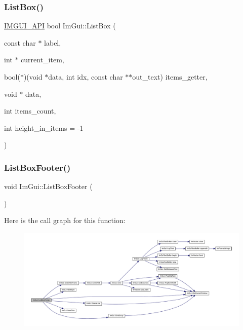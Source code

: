 \mbox{\label{namespace_im_gui_ab5865b671bfa22738fac9ffd214470e2}} 
\subsubsection{\texorpdfstring{List\+Box()}{ListBox()}\hspace{0.1cm}{\footnotesize\ttfamily [2/2]}}
{\footnotesize\ttfamily \mbox{\hyperlink{imgui_8h_a43829975e84e45d1149597467a14bbf5}{I\+M\+G\+U\+I\+\_\+\+A\+PI}} bool Im\+Gui\+::\+List\+Box (\begin{DoxyParamCaption}\item[{const char $\ast$}]{label,  }\item[{int $\ast$}]{current\+\_\+item,  }\item[{bool($\ast$)(void $\ast$data, int idx, const char $\ast$$\ast$out\+\_\+text)}]{items\+\_\+getter,  }\item[{void $\ast$}]{data,  }\item[{int}]{items\+\_\+count,  }\item[{int}]{height\+\_\+in\+\_\+items = {\ttfamily -\/1} }\end{DoxyParamCaption})}

\mbox{\label{namespace_im_gui_a9a0a8f6a4a67280dce7bd91310a83a03}} 
\subsubsection{\texorpdfstring{List\+Box\+Footer()}{ListBoxFooter()}}
{\footnotesize\ttfamily void Im\+Gui\+::\+List\+Box\+Footer (\begin{DoxyParamCaption}{ }\end{DoxyParamCaption})}

Here is the call graph for this function\+:
\nopagebreak
\begin{figure}[H]
\begin{center}
\leavevmode
\includegraphics[width=350pt]{namespace_im_gui_a9a0a8f6a4a67280dce7bd91310a83a03_cgraph}
\end{center}
\end{figure}
\mbox{\label{namespace_im_gui_a4003d6a6ab57f2fb43db80c6339a1aed}} 
